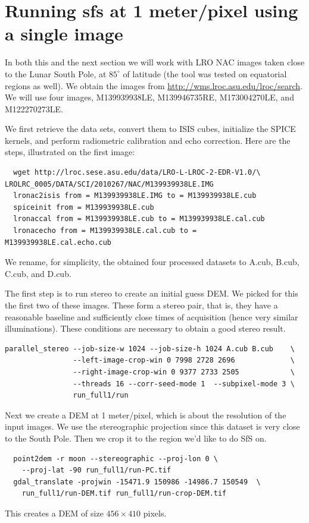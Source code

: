\section{Running sfs at 1 meter/pixel using a single image}

In both this and the next section we will work with LRO NAC images taken
close to the Lunar South Pole, at $85^\circ$ of latitude (the tool was
tested on equatorial regions as well). We obtain the images from
\url{http://wms.lroc.asu.edu/lroc/search}.  We will use four images,
M139939938LE, M139946735RE, M173004270LE, and M122270273LE.

We first retrieve the data sets, convert them to ISIS cubes, initialize
the SPICE kernels, and perform radiometric calibration and echo
correction. Here are the steps, illustrated on the first image:
\begin{verbatim}
  wget http://lroc.sese.asu.edu/data/LRO-L-LROC-2-EDR-V1.0/\
LROLRC_0005/DATA/SCI/2010267/NAC/M139939938LE.IMG
  lronac2isis from = M139939938LE.IMG to = M139939938LE.cub
  spiceinit from = M139939938LE.cub
  lronaccal from = M139939938LE.cub to = M139939938LE.cal.cub
  lronacecho from = M139939938LE.cal.cub to = M139939938LE.cal.echo.cub
\end{verbatim}
We rename, for simplicity, the obtained four processed datasets to
A.cub, B.cub, C.cub, and D.cub.

The first step is to run stereo to create an initial guess DEM. We
picked for this the first two of these images. These form a stereo pair,
that is, they have a reasonable baseline and sufficiently close times of
acquisition (hence very similar illuminations). These conditions are
necessary to obtain a good stereo result.
\begin{verbatim}
parallel_stereo --job-size-w 1024 --job-size-h 1024 A.cub B.cub    \
                --left-image-crop-win 0 7998 2728 2696             \
                --right-image-crop-win 0 9377 2733 2505            \
                --threads 16 --corr-seed-mode 1  --subpixel-mode 3 \
                run_full1/run
\end{verbatim}
Next we create a DEM at 1 meter/pixel, which is about the resolution
of the input images. We use the stereographic projection since this
dataset is very close to the South Pole. Then we crop it to the region
we'd like to do SfS on.
\begin{verbatim}
  point2dem -r moon --stereographic --proj-lon 0 \
    --proj-lat -90 run_full1/run-PC.tif
  gdal_translate -projwin -15471.9 150986 -14986.7 150549  \
    run_full1/run-DEM.tif run_full1/run-crop-DEM.tif
\end{verbatim}
This creates a DEM of size $456 \times 410$ pixels.

